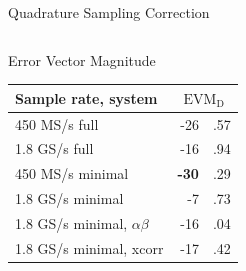 \documentclass[10pt]{beamer}
\newcommand{\mc}[2]{\multicolumn{#1}{c|}{#2}}
\begin{document}
\begin{frame}{Quadrature Sampling Correction}
\begin{columns}[T]
\begin{column}{.5\textwidth}
{\begin{block}{Error Vector Magnitude}
          \begin{tabular}{|l|r@{}l|}
            \hline
            Sample rate, system             & \mc{2}{$\text{EVM}_\text{D}$} \\ \hline
            450 MS/s full                   & -26&.57      \\ \hline
            1.8 GS/s full                   & -16&.94      \\ \hline
            450 MS/s minimal                & {\bf-30}&.29 \\ \hline
            1.8 GS/s minimal                & -7&.73       \\ \hline
            1.8 GS/s minimal, $\alpha\beta$ & -16&.04      \\ \hline
            1.8 GS/s minimal, xcorr         & -17&.42      \\ \hline
          \end{tabular}
        \end{block}
      }
    \end{column}
  \end{columns}
\end{frame}
\end{document}
